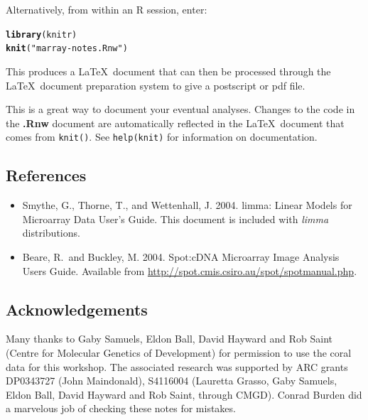 \documentclass[a4paper,9pt]{article}\usepackage[]{graphicx}\usepackage[]{color}
\makeatletter
\newcommand{\hlstr}[1]{\textcolor[rgb]{0.192,0.494,0.8}{#1}}%
\newcommand{\hlstd}[1]{\textcolor[rgb]{0.345,0.345,0.345}{#1}}%
\newcommand{\hlkwd}[1]{\textcolor[rgb]{0.737,0.353,0.396}{\textbf{#1}}}%
\newenvironment{kframe}{%
 \def\at@end@of@kframe{}%
 \ifinner\ifhmode%
  \def\at@end@of@kframe{\end{minipage}}%
  \begin{minipage}{\columnwidth}%
 \fi\fi%
 \def\FrameCommand##1{\hskip\@totalleftmargin \hskip-\fboxsep
 \colorbox{shadecolor}{##1}\hskip-\fboxsep
     \hskip-\linewidth \hskip-\@totalleftmargin \hskip\columnwidth}%
 \MakeFramed {\advance\hsize-\width
   \@totalleftmargin\z@ \linewidth\hsize
   \@setminipage}}%
 {\par\unskip\endMakeFramed%
 \at@end@of@kframe}
\newenvironment{knitrout}{}{} %
\makeatother
\begin{document}
Alternatively, from within an R session, enter:
\begin{knitrout}
\color{fgcolor}\begin{kframe}
\begin{alltt}
\hlkwd{library}\hlstd{(knitr)}
\hlkwd{knit}\hlstd{(}\hlstr{"marray-notes.Rnw"}\hlstd{)}
\end{alltt}
\end{kframe}
\end{knitrout}
This produces a \LaTeX\ document that can then be processed through the
\LaTeX\ document preparation system to give a postscript or pdf file.

This is a great way to document your eventual analyses.  Changes to
the code in the \textbf{.Rnw} document are automatically reflected
in the \LaTeX\ document that comes from \texttt{knit()}.
See \texttt{help(knit)} for information on documentation.

\subsection*{References}
\begin{itemize}
\item[] Smythe, G., Thorne, T., and Wettenhall, J. 2004. limma: Linear
Models for Microarray Data User's Guide.  This document is included
with \textit{limma} distributions.
\item[] Beare, R.\ and Buckley, M. 2004. Spot:cDNA Microarray Image
Analysis Users Guide.
Available from \url{http://spot.cmis.csiro.au/spot/spotmanual.php}.
\end{itemize}

\subsection*{Acknowledgements}
Many thanks to Gaby Samuels, Eldon Ball, David Hayward and Rob Saint
(Centre for Molecular Genetics of Development) for permission to use
the coral data for this workshop.  The associated research was
supported by ARC grants DP0343727 (John Maindonald), S4116004
(Lauretta Grasso, Gaby Samuels, Eldon Ball, David Hayward and Rob
Saint, through CMGD).  Conrad Burden did a marvelous job of checking
these notes for mistakes.
\end{document}
